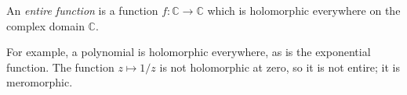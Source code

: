 \documentclass[12pt]{article}
\begin{document}
An \emph{entire function} is a function $f: \mathbb{C} \longrightarrow \mathbb{C}$ which is holomorphic everywhere on the complex domain $\mathbb{C}$.

For example, a polynomial is holomorphic everywhere, as is the exponential function.  The function $z\mapsto 1/z$ is not holomorphic at zero, so it is not entire; it is meromorphic.
\end{document}
